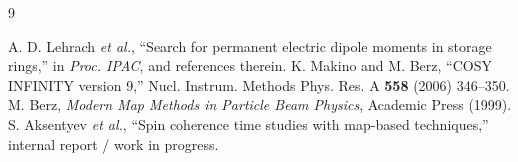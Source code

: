 \documentclass[a4paper,
               keeplastbox,   %
               ]{jacow}
\begin{document}
	{\printbibliography}
	{
	\begin{thebibliography}{9}
	
	 A. D. Lehrach \emph{et al.}, ``Search for permanent electric dipole moments in storage rings,'' in {\it Proc. IPAC}, and references therein.
	 K. Makino and M. Berz, ``COSY INFINITY version 9,'' Nucl. Instrum. Methods Phys. Res. A {\bf 558} (2006) 346--350.
	 M. Berz, {\it Modern Map Methods in Particle Beam Physics}, Academic Press (1999).
	 S. Aksentyev \emph{et al.}, ``Spin coherence time studies with map-based techniques,'' internal report / work in progress.
	
	\end{thebibliography}
}
\end{document}
